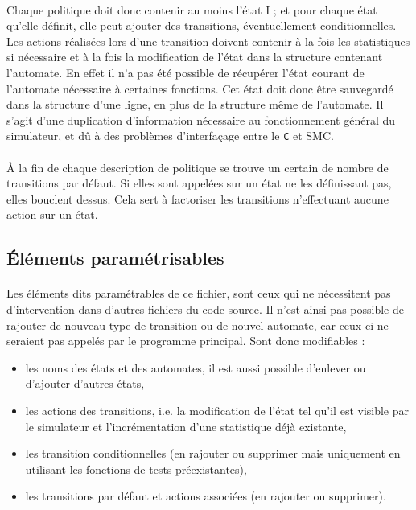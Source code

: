 \paragraph{}
Chaque politique doit donc contenir au moins l'état I ; et pour chaque état qu'elle définit, elle peut ajouter des transitions, éventuellement conditionnelles. Les actions réalisées lors d'une transition doivent contenir à la fois les statistiques si nécessaire et à la fois la modification de l'état dans la structure contenant l'automate. En effet il n'a pas été possible de récupérer l'état courant de l'automate nécessaire à certaines fonctions. Cet état doit donc être sauvegardé dans la structure d'une ligne, en plus de la structure même de l'automate. Il s'agit d'une duplication d'information nécessaire au fonctionnement général du simulateur, et dû à des problèmes d'interfaçage entre le \texttt{C} et \textsf{SMC}.

\paragraph{}
\`A la fin de chaque description de politique se trouve un certain de nombre de transitions par défaut. Si elles sont appelées sur un état ne les définissant pas, elles bouclent dessus. Cela sert à factoriser les transitions n'effectuant aucune action sur un état.

\subsection{\'Eléments paramétrisables}

\paragraph{}
Les éléments dits paramétrables de ce fichier, sont ceux qui ne nécessitent pas d'intervention dans d'autres fichiers du code source. Il n'est ainsi pas possible de rajouter de nouveau type de transition ou de nouvel automate, car ceux-ci ne seraient pas appelés par le programme principal. Sont donc modifiables : \\
\begin{itemize}
\item{les noms des états et des automates, il est aussi possible d'enlever ou d'ajouter d'autres états,}
\item{les actions des transitions, i.e. la modification de l'état tel qu'il est visible par le simulateur et l'incrémentation d'une statistique déjà existante,}
\item{les transition conditionnelles (en rajouter ou supprimer mais uniquement en utilisant les fonctions de tests préexistantes),}
\item{les transitions par défaut et actions associées (en rajouter ou supprimer).}
\end{itemize}

